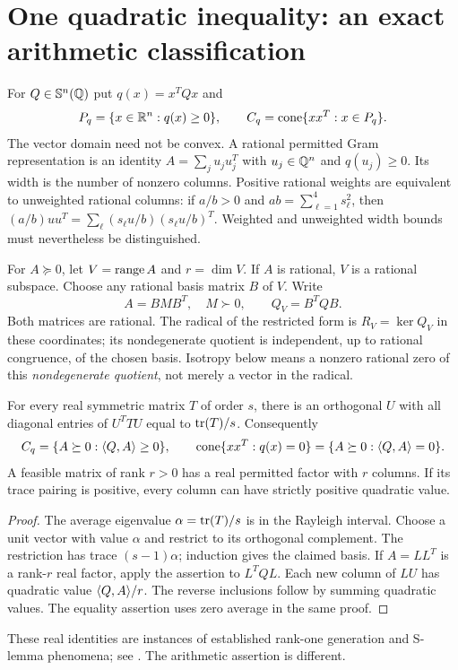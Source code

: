 \section{One quadratic inequality: an exact arithmetic classification}
For $Q\in\mathbb S^n(\mathbb Q)$ put $q(x)=x^TQx$ and
\[
 P_q=\{x\in\mathbb R^n:q(x)\geq0\},\qquad
 C_q=\operatorname{cone}\{xx^T:x\in P_q\}.
\]
The vector domain need not be convex. A rational permitted Gram representation is an identity $A=\sum_j u_ju_j^T$ with $u_j\in\mathbb Q^n$ and $q(u_j)\geq0$. Its width is the number of nonzero columns. Positive rational weights are equivalent to unweighted rational columns: if $a/b>0$ and $ab=\sum_{\ell=1}^4s_\ell^2$, then $(a/b)uu^T=\sum_\ell(s_\ell u/b)(s_\ell u/b)^T$. Weighted and unweighted width bounds must nevertheless be distinguished.

For $A\succeq0$, let $V=\operatorname{range} A$ and $r=\dim V$. If $A$ is rational, $V$ is a rational subspace. Choose any rational basis matrix $B$ of $V$. Write
\[
 A=BMB^T,\quad M\succ0,\qquad Q_V=B^TQB.
\]
Both matrices are rational. The radical of the restricted form is $R_V=\ker Q_V$ in these coordinates; its nondegenerate quotient is independent, up to rational congruence, of the chosen basis. Isotropy below means a nonzero rational zero of this \emph{nondegenerate quotient}, not merely a vector in the radical.

\begin{lemma}\label{lem:balance}
For every real symmetric matrix $T$ of order $s$, there is an orthogonal $U$ with all diagonal entries of $U^TTU$ equal to $\operatorname{tr}(T)/s$. Consequently
\[
 C_q=\{A\succeq0:\langle Q,A\rangle\geq0\},\qquad
 \operatorname{cone}\{xx^T:q(x)=0\}=\{A\succeq0:\langle Q,A\rangle=0\}.
\]
A feasible matrix of rank $r>0$ has a real permitted factor with $r$ columns. If its trace pairing is positive, every column can have strictly positive quadratic value.
\end{lemma}
\begin{proof}
The average eigenvalue $\alpha=\operatorname{tr}(T)/s$ is in the Rayleigh interval. Choose a unit vector with value $\alpha$ and restrict to its orthogonal complement. The restriction has trace $(s-1)\alpha$; induction gives the claimed basis. If $A=LL^T$ is a rank-$r$ real factor, apply the assertion to $L^TQL$. Each new column of $LU$ has quadratic value $\langle Q,A\rangle/r$. The reverse inclusions follow by summing quadratic values. The equality assertion uses zero average in the same proof.
\end{proof}
These real identities are instances of established rank-one generation and S-lemma phenomena; see \cite{SZ,NL}. The arithmetic assertion is different.

